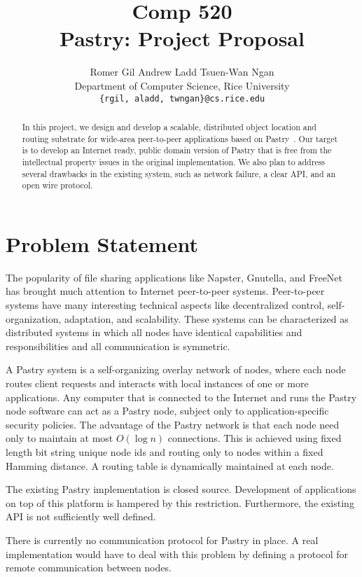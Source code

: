 \documentclass{article}
\title{{\large Comp 520}\\Pastry: Project Proposal}
\author{Romer Gil \hspace{8mm} Andrew Ladd \hspace{8mm} Tsuen-Wan Ngan\\
	\normalsize Department of Computer Science, Rice University\\
	\small \tt \{rgil, aladd, twngan\}@cs.rice.edu}
\date{}
\begin{document}
\maketitle
\begin{abstract}
In this project, we design and develop a scalable, distributed 
object location and routing substrate for wide-area peer-to-peer 
applications based on Pastry~\cite{RoD01B}.
Our target is to develop an Internet ready, public domain version of 
Pastry that is free from the intellectual property issues in 
the original implementation.
We also plan to address several drawbacks in the existing system, such as
network failure, a clear API, and an open wire protocol.
\end{abstract}


\section{Problem Statement}
The popularity of file sharing applications like Napster, 
Gnutella, and FreeNet~\cite{Nap,Gnu,CSW00} has brought much 
attention to Internet peer-to-peer systems.
Peer-to-peer systems have many interesting technical aspects 
like decentralized control, self-organization, 
adaptation, and scalability.
These systems can be characterized as distributed systems 
in which all nodes have identical capabilities and 
responsibilities and all communication is symmetric.

A Pastry system is a self-organizing overlay network of nodes, 
where each node routes client requests and interacts with 
local instances of one or more applications.
Any computer that is connected to the Internet and runs the 
Pastry node software can act as a Pastry node, subject 
only to application-specific security policies.  The advantage of the
Pastry network is that each node need only to maintain at most $O(\log
n)$ connections.  This is achieved using fixed length bit string
unique node ids and routing only to nodes within a fixed Hamming
distance.  A routing table is dynamically maintained at each node.

The existing Pastry implementation is closed source.  Development of
applications on top of this platform is hampered by this restriction.
Furthermore, the existing API is not sufficiently well defined. 

There is currently no communication protocol for Pastry in place.  A real
implementation would have to deal with this problem by defining a
protocol for remote communication between nodes.
\end{document}
